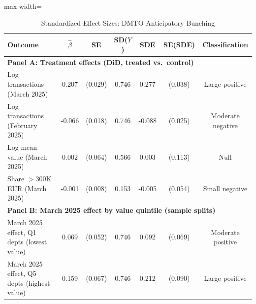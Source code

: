 \begin{table}[htbp]
\centering
\caption{Standardized Effect Sizes: DMTO Anticipatory Bunching}
\label{tab:sde}
\small
\begin{adjustbox}{max width=\textwidth}
\begin{tabular}{lcccccc}
\hline\hline
Outcome & $\hat{\beta}$ & SE & SD($Y$) & SDE & SE(SDE) & Classification \\
\hline
\multicolumn{7}{l}{\textbf{Panel A: Treatment effects (DiD, treated vs.~control)}} \\
Log transactions (March 2025) & 0.207 & (0.029) & 0.746 & 0.277 & (0.038) & Large positive \\
Log transactions (February 2025) & -0.066 & (0.018) & 0.746 & -0.088 & (0.025) & Moderate negative \\
Log mean value (March 2025) & 0.002 & (0.064) & 0.566 & 0.003 & (0.113) & Null \\
Share $>$300K EUR (March 2025) & -0.001 & (0.008) & 0.153 & -0.005 & (0.054) & Small negative \\
\hline
\multicolumn{7}{l}{\textbf{Panel B: March 2025 effect by value quintile (sample splits)}} \\
March 2025 effect, Q1 depts (lowest value) & 0.069 & (0.052) & 0.746 & 0.092 & (0.069) & Moderate positive \\
March 2025 effect, Q5 depts (highest value) & 0.159 & (0.067) & 0.746 & 0.212 & (0.090) & Large positive \\
\hline\hline
\end{tabular}
\end{adjustbox}


\end{table}
